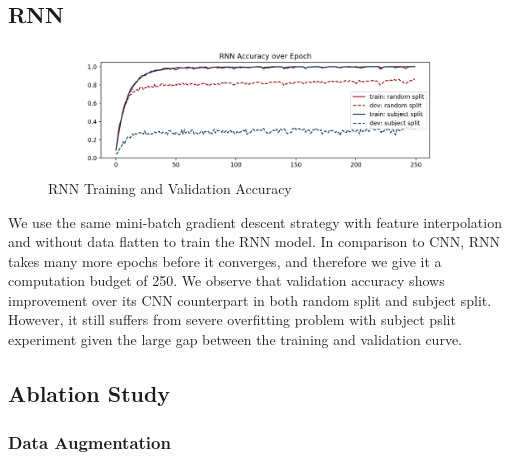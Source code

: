 \documentclass{article}
\begin{document}
\begin{multicols*}{2}
\subsection{RNN}

\begin{figure}[H]
    \centering
    \includegraphics[scale=0.35]{rnn_acc.png}
    \caption{RNN Training and Validation Accuracy}
    \label{fig:rnn_train_acc_plot}
\end{figure}

We use the same mini-batch gradient descent strategy with feature interpolation and without data flatten to train the RNN model. In comparison to CNN, RNN takes many more epochs before it converges, and therefore we give it a computation budget of 250. We observe that validation accuracy shows improvement over its CNN counterpart in both random split and subject split. However, it still suffers from severe overfitting problem with subject pslit experiment given the large gap between the training and validation curve.

\subsection{Ablation Study}
\subsubsection{Data Augmentation}




\end{multicols*}
\end{document}
